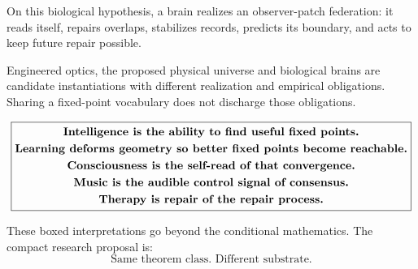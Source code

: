 \documentclass[11pt]{article}
\theoremstyle{remark}
\theoremstyle{plain}
\begin{document}
On this biological hypothesis, a brain realizes an observer-patch federation:
it reads itself, repairs overlaps, stabilizes records, predicts its boundary,
and acts to keep future repair possible.

Engineered optics, the proposed physical universe and biological brains are
candidate instantiations with different realization and empirical obligations.
Sharing a fixed-point vocabulary does not discharge those obligations.

\[
\boxed{
\begin{gathered}
\text{\bfseries Intelligence is the ability to find useful fixed points.}\\
\text{\bfseries Learning deforms geometry so better fixed points become reachable.}\\
\text{\bfseries Consciousness is the self-read of that convergence.}\\
\text{\bfseries Music is the audible control signal of consensus.}\\
\text{\bfseries Therapy is repair of the repair process.}
\end{gathered}
}
\]

These boxed interpretations go beyond the conditional mathematics. The compact
research proposal is:
\[
\boxed{
\text{Same theorem class. Different substrate.}
}
\]
\end{document}
